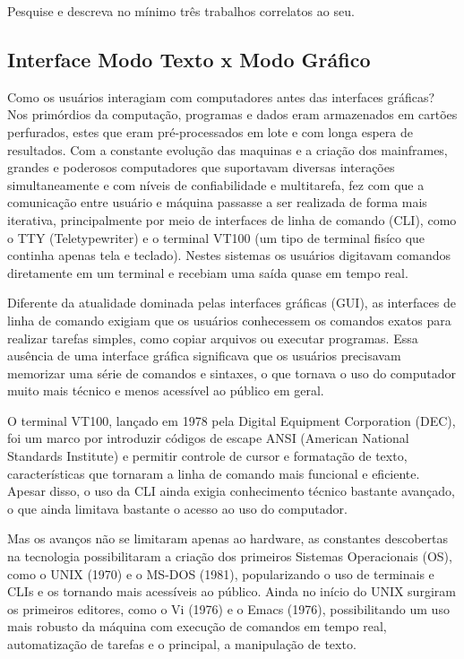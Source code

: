Pesquise e descreva no mínimo três trabalhos correlatos ao seu.

\subsection{Interface Modo Texto x Modo Gráfico}

Como os usuários interagiam com computadores antes das interfaces gráficas? Nos primórdios da computação, programas e dados eram armazenados em cartões
perfurados, estes que eram pré-processados em lote e com longa espera de resultados. Com a constante evolução das maquinas e a criação dos mainframes,
grandes e poderosos computadores que suportavam diversas interações simultaneamente e com níveis de confiabilidade e multitarefa, fez com que a comunicação
entre usuário e máquina passasse a ser realizada de forma mais iterativa, principalmente por meio de interfaces de linha de comando (CLI),
como o TTY (Teletypewriter) e o terminal VT100 (um tipo de terminal fisíco que continha apenas tela e teclado). Nestes sistemas os usuários digitavam
comandos diretamente em um terminal e recebiam uma saída quase em tempo real.

Diferente da atualidade dominada pelas interfaces gráficas (GUI), as interfaces de linha de comando exigiam que os usuários conhecessem os comandos exatos
para realizar tarefas simples, como copiar arquivos ou executar programas. Essa ausência de uma interface gráfica significava que os usuários precisavam
memorizar uma série de comandos e sintaxes, o que tornava o uso do computador muito mais técnico e menos acessível ao público em geral.

O terminal VT100, lançado em 1978 pela Digital Equipment Corporation (DEC), foi um marco por introduzir códigos de escape ANSI (American National Standards
Institute) e permitir controle de cursor e formatação de texto, características que tornaram a linha de comando mais funcional e eficiente. Apesar disso,
o uso da CLI ainda exigia conhecimento técnico bastante avançado, o que ainda limitava bastante o acesso ao uso do computador.

Mas os avanços não se limitaram apenas ao hardware, as constantes descobertas na tecnologia possibilitaram a criação dos primeiros Sistemas Operacionais (OS),
como o UNIX (1970) e o MS-DOS (1981), popularizando o uso de terminais e CLIs e os tornando mais acessíveis ao público. Ainda no início do UNIX surgiram
os primeiros editores, como o Vi (1976) e o Emacs (1976), possibilitando um uso mais robusto da máquina com execução de comandos em tempo real,
automatização de tarefas e o principal, a manipulação de texto.


